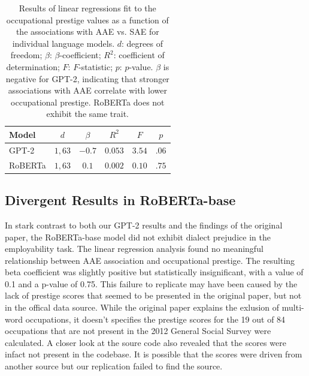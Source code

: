 \documentclass[11pt]{article}
\begin{document}
\begin{table}
    \centering
    \begin{tabular}{lccccc}
        \hline
        \textbf{Model} & \textbf{$d$} & \textbf{$\beta$} & \textbf{$R^2$} & \textbf{$F$} & \textbf{$p$} \\
        \hline
        GPT-2          & $1, 63$      & $-0.7$           & $0.053$        & $3.54$       & $.06$        \\
        RoBERTa        & $1, 63$      & $0.1$            & $0.002$        & $0.10$       & $.75$        \\
        \hline
    \end{tabular}

    \caption{Results of linear regressions fit to the occupational prestige values as a function of the associations with AAE vs. SAE for individual language models. $d$: degrees of freedom; $\beta$: $\beta$-coefficient; $R^2$: coefficient of determination; $F$: $F$-statistic; $p$: $p$-value. $\beta$ is negative for GPT-2, indicating that stronger associations with AAE correlate with lower occupational prestige. RoBERTa does not exhibit the same trait.}
    \label{tab:stat}
\end{table}

\subsection{Divergent Results in RoBERTa-base}

In stark contrast to both our GPT-2 results and the findings of the original paper, the RoBERTa-base model did not exhibit dialect prejudice in the employability task. The linear regression analysis found no meaningful relationship between AAE association and occupational prestige. The resulting beta coefficient was slightly positive but statistically insignificant, with a value of 0.1 and a p-value of 0.75. This failure to replicate may have been caused by the lack of prestige scores that seemed to be presented in the original paper, but not in the offical data source. While the original paper explains the exlusion of multi-word occupations, it doesn't specifies the prestige scores for the 19 out of 84 occupations that are not present in the 2012 General Social Survey \citep{smith_measuring_2014} were calculated. A closer look at the soure code also revealed that the scores were infact not present in the codebase. It is possible that the scores were driven from another source but our replication failed to find the source.
\end{document}

